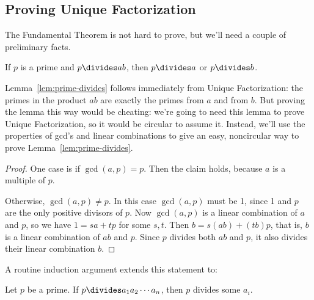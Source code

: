 \subsection{Proving Unique Factorization}

The Fundamental Theorem is not hard to prove, but we'll need a couple
of preliminary facts.

\begin{lemma}
\label{lem:prime-divides}
If $p$ is a prime and $p \divides ab$, then $p \divides a$ or $p
\divides b$.
\end{lemma}

Lemma~\ref{lem:prime-divides} follows immediately from Unique
Factorization: the primes in the product $ab$ are exactly the primes
from $a$ and from $b$.  But proving the lemma this way would be
cheating: we're going to need this lemma to prove Unique
Factorization, so it would be circular to assume it.  Instead, we'll
use the properties of gcd's and linear combinations to give an easy,
noncircular way to prove Lemma~\ref{lem:prime-divides}.

\begin{proof}
One case is if $\gcd(a, p) = p$.  Then the claim holds, because $a$ is
a multiple of $p$.

Otherwise, $\gcd(a, p) \neq p$.  In this case $\gcd(a, p)$ must be 1,
since 1 and $p$ are the only positive divisors of $p$.  Now $\gcd(a,
p)$ is a linear combination of $a$ and $p$, so we have $1=sa+tp$ for
some $s,t$.  Then $b =s(ab)+ (tb)p$, that is, $b$ is a linear
combination of $ab$ and $p$.  Since $p$ divides both $ab$ and $p$, it
also divides their linear combination $b$.
\end{proof}

A routine induction argument extends this statement to:\iffalse the
fact we assumed last time:\fi

\begin{lemma}
\label{lem:prime-divides-ind}
Let $p$ be a prime.  If $p \divides a_1 a_2 \cdots a_n$, then $p$
divides some $a_i$.
\end{lemma}

